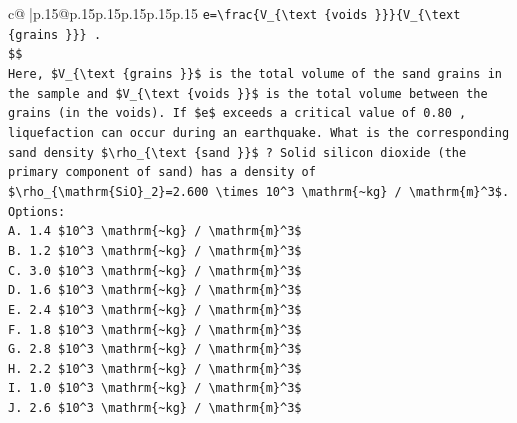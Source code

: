 \documentclass{article}
\begin{document}
{\begin{supertabular}{c@{$\;$}|p{.15\linewidth}@{}p{.15\linewidth}p{.15\linewidth}p{.15\linewidth}p{.15\linewidth}p{.15\linewidth}}
{{{\texttt{e=\textbackslash{}frac\{V\_\{\textbackslash{}text \{voids \}\}\}\{V\_\{\textbackslash{}text \{grains \}\}\} .} \\
\texttt{\$\$} \\
\texttt{Here, \$V\_\{\textbackslash{}text \{grains \}\}\$ is the total volume of the sand grains in the sample and \$V\_\{\textbackslash{}text \{voids \}\}\$ is the total volume between the grains (in the voids). If \$e\$ exceeds a critical value of 0.80 , liquefaction can occur during an earthquake. What is the corresponding sand density \$\textbackslash{}rho\_\{\textbackslash{}text \{sand \}\}\$ ? Solid silicon dioxide (the primary component of sand) has a density of \$\textbackslash{}rho\_\{\textbackslash{}mathrm\{SiO\}\_2\}=2.600 \textbackslash{}times 10\^{}3 \textbackslash{}mathrm\{\textasciitilde{}kg\} / \textbackslash{}mathrm\{m\}\^{}3\$.} \\
\texttt{Options:} \\
\texttt{A. 1.4 \$10\^{}3 \textbackslash{}mathrm\{\textasciitilde{}kg\} / \textbackslash{}mathrm\{m\}\^{}3\$} \\
\texttt{B. 1.2 \$10\^{}3 \textbackslash{}mathrm\{\textasciitilde{}kg\} / \textbackslash{}mathrm\{m\}\^{}3\$} \\
\texttt{C. 3.0 \$10\^{}3 \textbackslash{}mathrm\{\textasciitilde{}kg\} / \textbackslash{}mathrm\{m\}\^{}3\$} \\
\texttt{D. 1.6 \$10\^{}3 \textbackslash{}mathrm\{\textasciitilde{}kg\} / \textbackslash{}mathrm\{m\}\^{}3\$} \\
\texttt{E. 2.4 \$10\^{}3 \textbackslash{}mathrm\{\textasciitilde{}kg\} / \textbackslash{}mathrm\{m\}\^{}3\$} \\
\texttt{F. 1.8 \$10\^{}3 \textbackslash{}mathrm\{\textasciitilde{}kg\} / \textbackslash{}mathrm\{m\}\^{}3\$} \\
\texttt{G. 2.8 \$10\^{}3 \textbackslash{}mathrm\{\textasciitilde{}kg\} / \textbackslash{}mathrm\{m\}\^{}3\$} \\
\texttt{H. 2.2 \$10\^{}3 \textbackslash{}mathrm\{\textasciitilde{}kg\} / \textbackslash{}mathrm\{m\}\^{}3\$} \\
\texttt{I. 1.0 \$10\^{}3 \textbackslash{}mathrm\{\textasciitilde{}kg\} / \textbackslash{}mathrm\{m\}\^{}3\$} \\
\texttt{J. 2.6 \$10\^{}3 \textbackslash{}mathrm\{\textasciitilde{}kg\} / \textbackslash{}mathrm\{m\}\^{}3\$} \\
            }
        }
    }
     \\ \\


\end{supertabular}}
\end{document}
